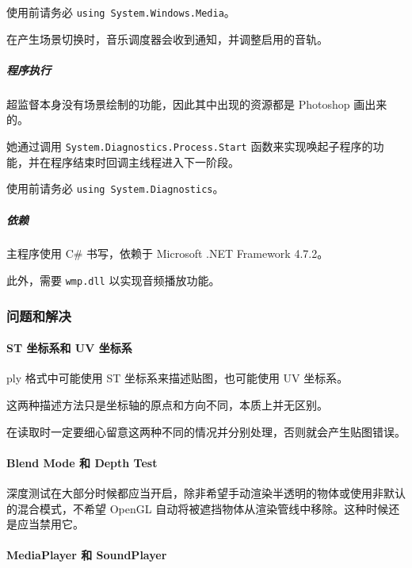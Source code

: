 \documentclass[
]{article}
\begin{document}
使用前请务必 \texttt{using\ System.Windows.Media}。

在产生场景切换时，音乐调度器会收到通知，并调整启用的音轨。

\hypertarget{header-n264}{%
\subparagraph{程序执行}\label{header-n264}}

超监督本身没有场景绘制的功能，因此其中出现的资源都是 Photoshop
画出来的。

她通过调用 \texttt{System.Diagnostics.Process.Start}
函数来实现唤起子程序的功能，并在程序结束时回调主线程进入下一阶段。

使用前请务必 \texttt{using\ System.Diagnostics}。

\hypertarget{header-n268}{%
\subparagraph{依赖}\label{header-n268}}

主程序使用 C\# 书写，依赖于 Microsoft .NET Framework 4.7.2。

此外，需要 \texttt{wmp.dll} 以实现音频播放功能。

\hypertarget{header-n271}{%
\subsubsection{问题和解决}\label{header-n271}}

\hypertarget{header-n272}{%
\paragraph{ST 坐标系和 UV 坐标系}\label{header-n272}}

ply 格式中可能使用 ST 坐标系来描述贴图，也可能使用 UV 坐标系。

这两种描述方法只是坐标轴的原点和方向不同，本质上并无区别。

在读取时一定要细心留意这两种不同的情况并分别处理，否则就会产生贴图错误。

\hypertarget{header-n276}{%
\paragraph{Blend Mode 和 Depth Test}\label{header-n276}}

深度测试在大部分时候都应当开启，除非希望手动渲染半透明的物体或使用非默认的混合模式，不希望
OpenGL 自动将被遮挡物体从渲染管线中移除。这种时候还是应当禁用它。

\hypertarget{header-n278}{%
\paragraph{MediaPlayer 和 SoundPlayer}\label{header-n278}}
\end{document}
